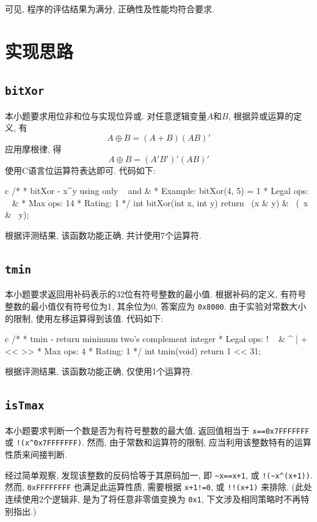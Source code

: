 可见, 程序的评估结果为满分, 正确性及性能均符合要求.

\section{实现思路}\label{procedure}

\subsection{\texttt{bitXor}}

本小题要求用位非和位与实现位异或. 对任意逻辑变量$A$和$B$, 根据异或运算的定义, 有
$$A \oplus B = (A+B)(AB)' $$
应用摩根律, 得
$$A \oplus B = (A'B')'(AB)' $$
使用C语言位运算符表达即可. 代码如下:
\begin{code}{c}
/*
 * bitXor - x^y using only ~ and &
 *   Example: bitXor(4, 5) = 1
 *   Legal ops: ~ &
 *   Max ops: 14
 *   Rating: 1
 */
int bitXor(int x, int y) { return ~(x & y) & ~(~x & ~y); }
\end{code}

根据评测结果, 该函数功能正确, 共计使用7个运算符.

\subsection{\texttt{tmin}}

本小题要求返回用补码表示的32位有符号整数的最小值. 根据补码的定义, 有符号整数的最小值仅有符号位为1, 其余位为0, 答案应为 \verb|0x8000|. 由于实验对常数大小的限制, 使用左移运算得到该值. 代码如下:

\begin{code}{c}
/*
 * tmin - return minimum two's complement integer
 *   Legal ops: ! ~ & ^ | + << >>
 *   Max ops: 4
 *   Rating: 1
 */
int tmin(void) { return 1 << 31; }
\end{code}

根据评测结果, 该函数功能正确, 仅使用1个运算符.

\subsection{\texttt{isTmax}}

本小题要求判断一个数是否为有符号整数的最大值, 返回值相当于 \verb|x==0x7FFFFFFF| 或 \verb|!(x^0x7FFFFFFF)|. 然而, 由于常数和运算符的限制, 应当利用该整数特有的运算性质来间接判断. 

经过简单观察, 发现该整数的反码恰等于其原码加一, 即 \verb|~x==x+1|, 或 \verb|!(~x^(x+1))|. 然而, \verb|0xFFFFFFFF| 也满足此运算性质, 需要根据 \verb|x+1!=0|, 或 \verb|!!(x+1)| 来排除. (此处连续使用2个逻辑非, 是为了将任意非零值变换为 \verb|0x1|, 下文涉及相同策略时不再特别指出.)

